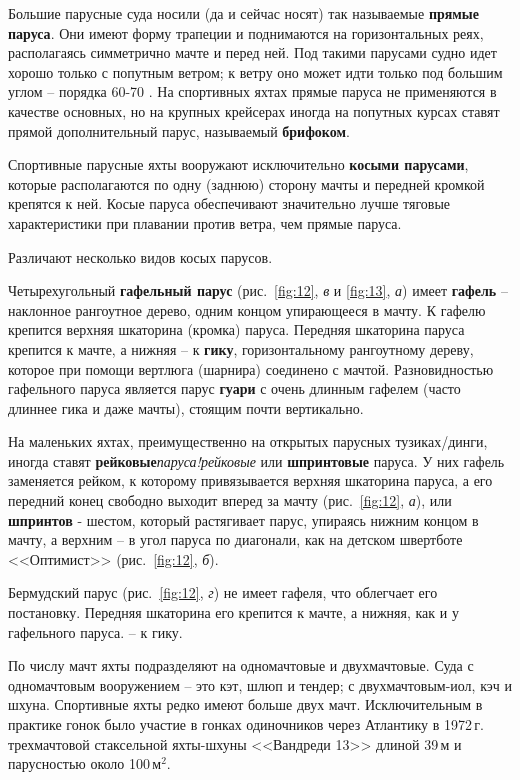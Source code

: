 \documentclass[a4paper, 12pt, twoside, final]{scrbook}
\begin{document}
Большие парусные суда носили (да и сейчас носят) так называемые \textbf{прямые
паруса}. Они имеют форму трапеции и поднимаются на горизонтальных
реях, располагаясь симметрично мачте и перед ней. Под такими парусами
судно идет хорошо только с попутным ветром; к ветру оно может идти
только под большим углом \--- порядка 60-70 . На спортивных яхтах прямые
паруса не применяются в качестве основных, но на крупных крейсерах
иногда на попутных курсах ставят прямой дополнительный парус, называемый
\textbf{брифоком}.

Спортивные парусные яхты вооружают исключительно \textbf{косыми парусами},
которые располагаются по одну (заднюю) сторону мачты и передней кромкой
крепятся к ней. Косые паруса обеспечивают значительно лучше тяговые
характеристики при плавании против ветра, чем прямые паруса.

Различают несколько видов косых парусов.

Четырехугольный \textbf{гафельный парус} (рис.~\ref{fig:12},
\emph{в} и \ref{fig:13}, \emph{а})
имеет \textbf{гафель} \--- наклонное рангоутное дерево, одним концом
упирающееся в мачту. К гафелю крепится верхняя шкаторина (кромка)
паруса. Передняя шкаторина паруса крепится к мачте, а нижняя \--- к \textbf{гику},
горизонтальному рангоутному дереву, которое при помощи вертлюга (шарнира) соединено с мачтой. Разновидностью гафельного паруса является парус
\textbf{гуари} с очень длинным гафелем (часто длиннее гика и даже
мачты), стоящим почти вертикально.

На маленьких яхтах, преимущественно на открытых парусных тузиках\-/динги,
иногда ставят \textbf{рейковые}\textit{паруса!рейковые} или \textbf{шпринтовые} паруса. У
них гафель заменяется рейком, к которому привязывается верхняя шкаторина
паруса, а его передний конец свободно выходит вперед за мачту (рис.~\ref{fig:12}, \emph{а}), или \textbf{шпринтов}
- шестом, который растягивает парус, упираясь нижним концом в мачту,
а верхним \--- в угол паруса по диагонали, как на детском швертботе <<Оптимист>>
(рис.~\ref{fig:12}, \emph{б}).

Бермудский парус (рис.~\ref{fig:12},
\emph{г}) не имеет гафеля, что облегчает его постановку. Передняя
шкаторина его крепится к мачте, а нижняя, как и у гафельного паруса.
\--- к гику. 

По числу мачт яхты подразделяют на одномачтовые и двухмачтовые. Суда
с одномачтовым вооружением \--- это кэт, шлюп и тендер; с двухмачтовым-иол,
кэч и шхуна. Спортивные яхты редко имеют больше двух мачт. Исключительным
в практике гонок было участие в гонках одиночников через Атлантику
в 1972\,г. трехмачтовой стаксельной яхты-шхуны <<Вандреди 13>> длиной
39\,м и парусностью около 100\,$\mbox{м}^{2}$.
\end{document}
